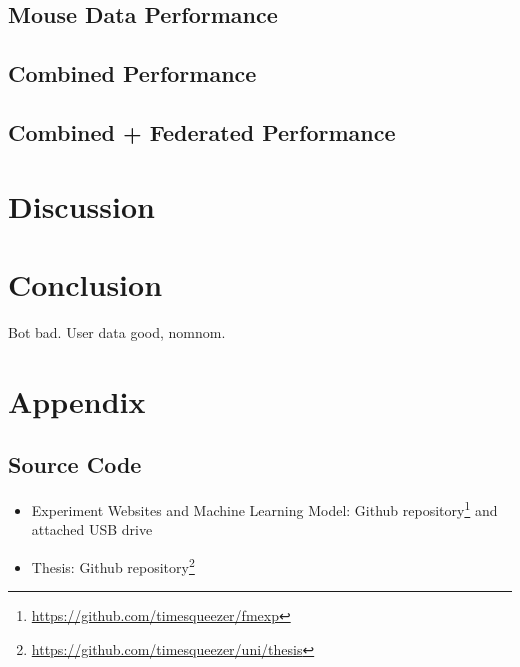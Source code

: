 \documentclass[
    fontsize=12pt,
    headings=small,
    parskip=half,           %
    bibliography=totoc,
    numbers=noenddot,       %
    open=any,               %
    final                   %
]{scrreprt}
\begin{document}
\section{Mouse Data Performance}

\section{Combined Performance}

\section{Combined + Federated Performance}


\chapter{Discussion}


\chapter{Conclusion}
Bot bad. User data good, nomnom.


\begin{raggedright}
  \printbibliography
\end{raggedright}

\chapter*{Appendix}

\section*{Source Code}

\begin{itemize}
	\item Experiment Websites and Machine Learning Model: Github repository\footnote{\url{https://github.com/timesqueezer/fmexp}} and attached USB drive
	\item Thesis: Github repository\footnote{\url{https://github.com/timesqueezer/uni/thesis}}
\end{itemize}
\end{document}
